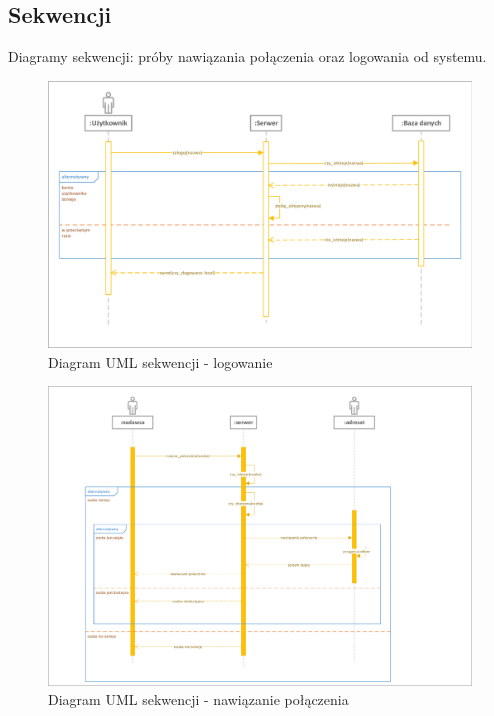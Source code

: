 \documentclass[12pt,a4paper]{article}
\begin{document}
	\pagebreak
	\subsection{Sekwencji}
	\par Diagramy sekwencji: próby nawiązania połączenia oraz logowania od systemu.
	
	\begin{figure}[h!]
		\begin{center}
			\includegraphics*[width=.95\textwidth]{UML_sekwencji_logowanie.pdf}
		\end{center}
		\caption{Diagram UML sekwencji - logowanie}
	\end{figure}
	
	\pagebreak
	\begin{figure}[h!]
		\begin{center}
			\includegraphics*[width=.95\textwidth]{UML_sekwencji_nawiazanie_rozmowy.pdf}
		\end{center}
		\caption{Diagram UML sekwencji - nawiązanie połączenia}
	\end{figure}
	
\end{document}
